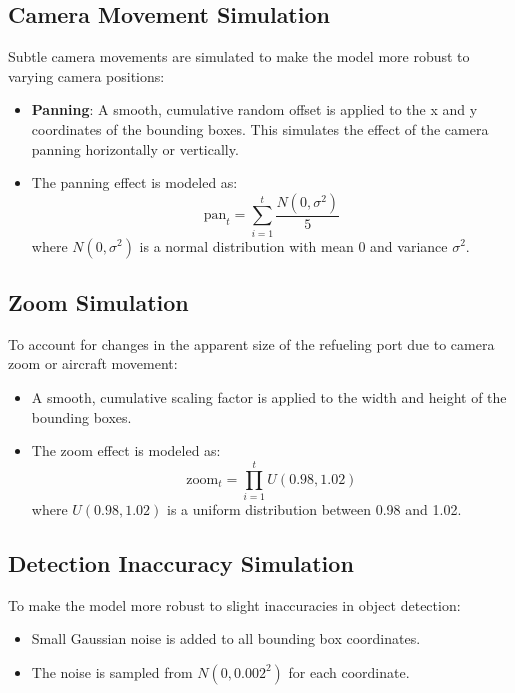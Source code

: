 \documentclass[12pt,oneside]{book} %
\begin{document}
\subsection{Camera Movement Simulation}

Subtle camera movements are simulated to make the model more robust to varying
camera positions:

\begin{itemize}
    \item \textbf{Panning}: A smooth, cumulative random offset is applied to the x and y coordinates of the bounding boxes. This simulates the effect of the camera panning horizontally or vertically.
    \item The panning effect is modeled as:
          \begin{equation}
              \text{pan}_t = \sum_{i=1}^t \frac{N(0, \sigma^2)}{5}
          \end{equation}
          where $N(0, \sigma^2)$ is a normal distribution with mean 0 and variance $\sigma^2$.
\end{itemize}

\subsection{Zoom Simulation}

To account for changes in the apparent size of the refueling port due to camera
zoom or aircraft movement:

\begin{itemize}
    \item A smooth, cumulative scaling factor is applied to the width and height of the
          bounding boxes.
    \item The zoom effect is modeled as:
          \begin{equation}
              \text{zoom}_t = \prod_{i=1}^t U(0.98, 1.02)
          \end{equation}
          where $U(0.98, 1.02)$ is a uniform distribution between 0.98 and 1.02.
\end{itemize}

\subsection{Detection Inaccuracy Simulation}

To make the model more robust to slight inaccuracies in object detection:

\begin{itemize}
    \item Small Gaussian noise is added to all bounding box coordinates.
    \item The noise is sampled from $N(0, 0.002^2)$ for each coordinate.
\end{itemize}
\end{document}
